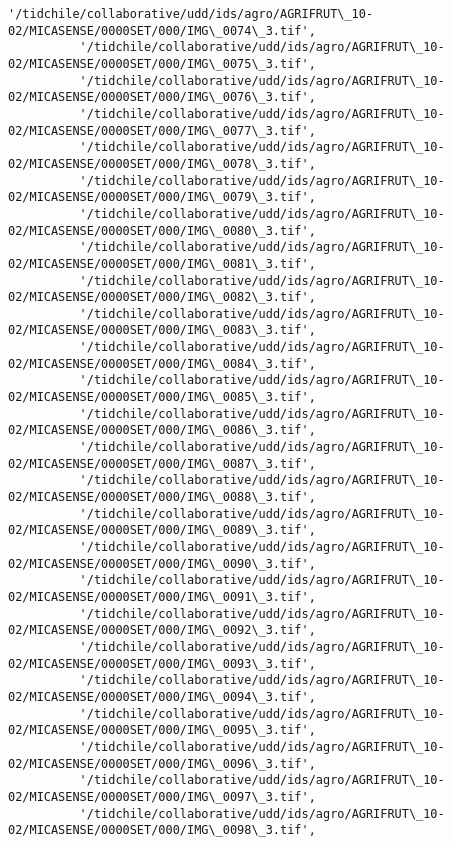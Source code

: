 \documentclass[11pt]{article}
\begin{document}
\begin{Verbatim}[commandchars=\\\{\}]
          '/tidchile/collaborative/udd/ids/agro/AGRIFRUT\_10-02/MICASENSE/0000SET/000/IMG\_0074\_3.tif',
          '/tidchile/collaborative/udd/ids/agro/AGRIFRUT\_10-02/MICASENSE/0000SET/000/IMG\_0075\_3.tif',
          '/tidchile/collaborative/udd/ids/agro/AGRIFRUT\_10-02/MICASENSE/0000SET/000/IMG\_0076\_3.tif',
          '/tidchile/collaborative/udd/ids/agro/AGRIFRUT\_10-02/MICASENSE/0000SET/000/IMG\_0077\_3.tif',
          '/tidchile/collaborative/udd/ids/agro/AGRIFRUT\_10-02/MICASENSE/0000SET/000/IMG\_0078\_3.tif',
          '/tidchile/collaborative/udd/ids/agro/AGRIFRUT\_10-02/MICASENSE/0000SET/000/IMG\_0079\_3.tif',
          '/tidchile/collaborative/udd/ids/agro/AGRIFRUT\_10-02/MICASENSE/0000SET/000/IMG\_0080\_3.tif',
          '/tidchile/collaborative/udd/ids/agro/AGRIFRUT\_10-02/MICASENSE/0000SET/000/IMG\_0081\_3.tif',
          '/tidchile/collaborative/udd/ids/agro/AGRIFRUT\_10-02/MICASENSE/0000SET/000/IMG\_0082\_3.tif',
          '/tidchile/collaborative/udd/ids/agro/AGRIFRUT\_10-02/MICASENSE/0000SET/000/IMG\_0083\_3.tif',
          '/tidchile/collaborative/udd/ids/agro/AGRIFRUT\_10-02/MICASENSE/0000SET/000/IMG\_0084\_3.tif',
          '/tidchile/collaborative/udd/ids/agro/AGRIFRUT\_10-02/MICASENSE/0000SET/000/IMG\_0085\_3.tif',
          '/tidchile/collaborative/udd/ids/agro/AGRIFRUT\_10-02/MICASENSE/0000SET/000/IMG\_0086\_3.tif',
          '/tidchile/collaborative/udd/ids/agro/AGRIFRUT\_10-02/MICASENSE/0000SET/000/IMG\_0087\_3.tif',
          '/tidchile/collaborative/udd/ids/agro/AGRIFRUT\_10-02/MICASENSE/0000SET/000/IMG\_0088\_3.tif',
          '/tidchile/collaborative/udd/ids/agro/AGRIFRUT\_10-02/MICASENSE/0000SET/000/IMG\_0089\_3.tif',
          '/tidchile/collaborative/udd/ids/agro/AGRIFRUT\_10-02/MICASENSE/0000SET/000/IMG\_0090\_3.tif',
          '/tidchile/collaborative/udd/ids/agro/AGRIFRUT\_10-02/MICASENSE/0000SET/000/IMG\_0091\_3.tif',
          '/tidchile/collaborative/udd/ids/agro/AGRIFRUT\_10-02/MICASENSE/0000SET/000/IMG\_0092\_3.tif',
          '/tidchile/collaborative/udd/ids/agro/AGRIFRUT\_10-02/MICASENSE/0000SET/000/IMG\_0093\_3.tif',
          '/tidchile/collaborative/udd/ids/agro/AGRIFRUT\_10-02/MICASENSE/0000SET/000/IMG\_0094\_3.tif',
          '/tidchile/collaborative/udd/ids/agro/AGRIFRUT\_10-02/MICASENSE/0000SET/000/IMG\_0095\_3.tif',
          '/tidchile/collaborative/udd/ids/agro/AGRIFRUT\_10-02/MICASENSE/0000SET/000/IMG\_0096\_3.tif',
          '/tidchile/collaborative/udd/ids/agro/AGRIFRUT\_10-02/MICASENSE/0000SET/000/IMG\_0097\_3.tif',
          '/tidchile/collaborative/udd/ids/agro/AGRIFRUT\_10-02/MICASENSE/0000SET/000/IMG\_0098\_3.tif',

\end{Verbatim}
\end{document}
